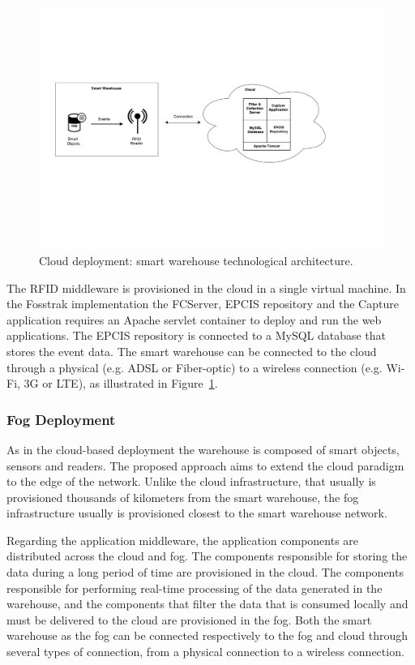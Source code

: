 \begin{figure}[ht!]
\centering
\includegraphics[width=.5\textwidth]{./figures/implementation_cloud_architecture}
\caption{Cloud deployment: smart warehouse technological architecture.}
\label{fig:implementation_cloud_architecture}
\end{figure}

The \gls{RFID} middleware is provisioned in the cloud in a single virtual machine. In the
Fosstrak implementation the \gls{FCServer}, \gls{EPCIS} repository and the Capture application
requires an Apache servlet container to deploy and run the web applications. The \gls{EPCIS}
repository is connected to a MySQL database that stores the event data. The smart warehouse can be
connected to the cloud through a physical (e.g. \gls{ADSL} or Fiber-optic) to a wireless
connection (e.g. Wi-Fi, 3G or \gls{LTE}), as illustrated in Figure~\ref{fig:implementation_cloud_architecture}.

\subsubsection{Fog Deployment}
\label{subs:sol_fog}
As in the cloud-based deployment the warehouse is composed of smart objects, sensors and readers.
The proposed approach aims to extend the cloud paradigm to the edge of the network. Unlike the
cloud infrastructure, that usually is provisioned thousands of kilometers from the smart warehouse,
the fog infrastructure usually is provisioned closest to the smart warehouse network.

Regarding the application middleware, the application components are distributed across the cloud and
fog. The components responsible for storing the data during a long period of time are provisioned in
the cloud. The components responsible for performing real-time processing of the data generated in the
warehouse, and the components that filter the data that is consumed locally and must be delivered to
the cloud are provisioned in the fog. Both the smart warehouse as the fog can be connected respectively
to the fog and cloud through several types of connection, from a physical connection to a wireless
connection.

